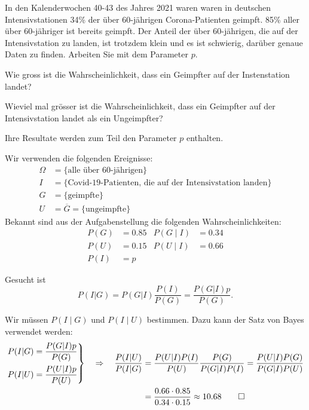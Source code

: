 In den Kalenderwochen 40-43 des Jahres 2021
waren waren in deutschen Intensivstationen
34\% der über 60-jährigen Corona-Patienten geimpft.
85\% aller über 60-jähriger ist bereits geimpft.
Der Anteil der über 60-jährigen, die auf der Intensivstation zu landen,
ist trotzdem klein und es ist schwierig, darüber genaue Daten zu finden.
Arbeiten Sie mit dem Parameter $p$.
\begin{teilaufgaben}
\item 
Wie gross ist die Wahrscheinlichkeit, dass ein Geimpfter auf der
Instenstation landet?
\item
Wieviel mal grösser ist die Wahrscheinlichkeit, dass ein Geimpfter
auf der Intensivstation landet als ein Ungeimpfter?
\end{teilaufgaben}


\begin{hinweis}
Ihre Resultate werden zum Teil den Parameter $p$ enthalten.
\end{hinweis}

\begin{loesung}
Wir verwenden die folgenden Ereignisse:
\begin{align*}
\Omega&=\{\text{alle über 60-jährigen}\}
\\
I&=\{\text{Covid-19-Patienten, die auf der Intensivstation landen}\}
\\
G&=\{\text{geimpfte}\}
\\
U&=\overline{G}=\{\text{ungeimpfte}\}
\end{align*}
Bekannt sind aus der Aufgabenstellung die folgenden Wahrscheinlichkeiten:
\begin{align*}
P(G)       &= 0.85 &
P(G\mid I) &= 0.34 \\
P(U)       &= 0.15 &
P(U\mid I) &= 0.66 \\
P(I)       &= p
\end{align*}
\begin{teilaufgaben}
\item
Gesucht ist
\[
P(I|G)
=
P(G|I) \frac{P(I)}{P(G)}
=
\frac{P(G|I)p}{P(G)}.
\]
\item
Wir müssen $P(I\mid G)$ und $P(I\mid U)$ bestimmen.
Dazu kann der Satz von Bayes verwendet werden:
\begin{align*}
\left.
\begin{aligned}
P(I|G) &= \frac{P(G|I)p}{P(G)}
\\
P(I|U) &= \frac{P(U|I)p}{P(U)}
\end{aligned}
\right\}
\quad\Rightarrow\quad
\frac{P(I|U)}{P(I|G)}
&=
\frac{P(U|I)P(I)}{P(U)} \frac{P(G)}{P(G|I)P(I)}
=
\frac{P(U|I)P(G)}{P(G|I)P(U)}
\\
&=
\frac{0.66\cdot 0.85}{0.34\cdot 0.15}
\approx
10.68
\qedhere
\end{align*}
\end{teilaufgaben}
\end{loesung}

